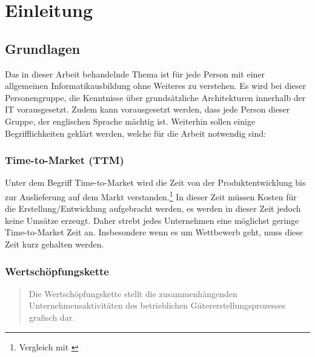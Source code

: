 \chapter{Einleitung}
\label{chap:einleitung}

\section{Grundlagen}
\label{sec:Grundlagen}
Das in dieser Arbeit behandelnde Thema ist für jede Person mit einer allgemeinen Informatikausbildung ohne Weiteres zu verstehen. Es wird bei dieser Personengruppe, die Kenntnisse über grundsätzliche Architekturen innerhalb der IT vorausgesetzt. Zudem kann vorausgesetzt werden, dass jede Person dieser Gruppe, der englischen Sprache mächtig ist. Weiterhin sollen  einige Begrifflichkeiten geklärt werden, welche für die Arbeit notwendig sind:

\subsection{Time-to-Market (TTM)}
\label{subsec:ttm}
Unter dem Begriff Time-to-Market wird die Zeit von der Produktentwicklung bis zur Auslieferung auf dem Markt verstanden.\footnote{Vergleich mit \cite{ttm:BusinessDictionary}}  In dieser Zeit müssen Kosten für die Erstellung/Entwicklung aufgebracht werden, es werden in dieser Zeit jedoch keine Umsätze erzeugt. Daher strebt jedes Unternehmen eine möglichst geringe Time-to-Market Zeit an. Insbesondere wenn es um Wettbewerb geht, muss diese Zeit kurz gehalten werden.

\subsection{Wertschöpfungskette}
\label{subsec:Wertschoepfungskette}
\begin{quotation}
\frqq Die Wertschöpfungskette stellt die zusammenhängenden Unternehmensaktivitäten des betrieblichen Gütererstellungsprozesses grafisch dar.\flqq \cite{gabler}
\end{quotation}

